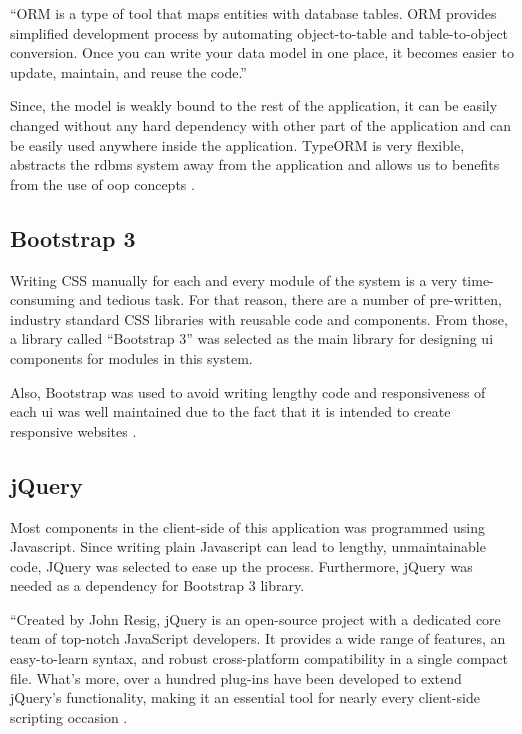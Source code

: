 \documentclass[12pt]{report}
\begin{document}
``ORM is a type of tool that maps entities with database tables. ORM provides simplified development process by automating object-to-table and table-to-object conversion. Once you can write your data model in one place, it becomes easier to update, maintain, and reuse the code.''\cite{tpoint_2020_typeorm}

Since, the model is weakly bound to the rest of the application, it can be easily changed without any hard dependency with other part of the application and can be easily used anywhere inside the application. TypeORM is very flexible, abstracts the \acrshort{rdbms} system away from the application and allows us to benefits from the use of \acrshort{oop} concepts \cite{tpoint_2020_typeorm}.

\subsection{Bootstrap 3}
Writing CSS manually for each and every module of the system is a very time-consuming and tedious task. For that reason, there are a number of pre-written, industry standard CSS libraries with reusable code and components. From those, a library called ``Bootstrap 3'' was selected as the main library for designing \acrshort{ui} components for modules in this system.

Also, Bootstrap was used to avoid writing lengthy code and responsiveness of each \acrshort{ui} was well maintained due to the fact that it is intended to create responsive websites \cite{chahal_2019_bootstrap}.

\subsection{jQuery}
Most components in the client-side of this application was programmed using Javascript. Since writing plain Javascript can lead to lengthy, unmaintainable code, JQuery was selected to ease up the process. Furthermore, jQuery was needed as a dependency for Bootstrap 3 library.

``Created by John Resig, jQuery is an open-source project with a dedicated core team of top-notch JavaScript developers. It provides a wide range of features, an easy-to-learn syntax, and robust cross-platform compatibility in a single compact file. What's
more, over a hundred plug-ins have been developed to extend jQuery's functionality, making it an essential tool for nearly every client-side scripting occasion \cite{chaffer_2007_jquery}.
\end{document}

